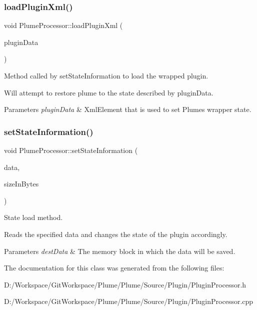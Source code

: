 \subsubsection{\texorpdfstring{load\+Plugin\+Xml()}{loadPluginXml()}}
{\footnotesize\ttfamily void Plume\+Processor\+::load\+Plugin\+Xml (\begin{DoxyParamCaption}\item[{const Xml\+Element \&}]{plugin\+Data }\end{DoxyParamCaption})}



Method called by set\+State\+Information to load the wrapped plugin. 

Will attempt to restore plume to the state described by plugin\+Data.


\begin{DoxyParams}{Parameters}
{\em plugin\+Data} & Xml\+Element that is used to set Plume\textquotesingle{}s wrapper state. \\
\hline
\end{DoxyParams}
\mbox{\label{class_plume_processor_aa7ab9da73c37f6db69ea6c7e1e4a0211}} 
\subsubsection{\texorpdfstring{set\+State\+Information()}{setStateInformation()}}
{\footnotesize\ttfamily void Plume\+Processor\+::set\+State\+Information (\begin{DoxyParamCaption}\item[{const void $\ast$}]{data,  }\item[{int}]{size\+In\+Bytes }\end{DoxyParamCaption})\hspace{0.3cm}{\ttfamily [override]}}



State load method. 

Reads the specified data and changes the state of the plugin accordingly.


\begin{DoxyParams}{Parameters}
{\em dest\+Data} & The memory block in which the data will be saved. \\
\hline
\end{DoxyParams}


The documentation for this class was generated from the following files\+:\begin{DoxyCompactItemize}
\item 
D\+:/\+Workspace/\+Git\+Workspace/\+Plume/\+Plume/\+Source/\+Plugin/Plugin\+Processor.\+h\item 
D\+:/\+Workspace/\+Git\+Workspace/\+Plume/\+Plume/\+Source/\+Plugin/Plugin\+Processor.\+cpp\end{DoxyCompactItemize}
